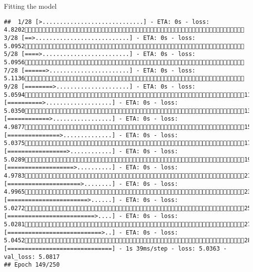 \documentclass[
  ignorenonframetext,
]{beamer}
\begin{document}
\begin{frame}[fragile]{Fitting the model}
\begin{verbatim}
##  1/28 [>.............................] - ETA: 0s - loss: 4.8202 3/28 [==>...........................] - ETA: 0s - loss: 5.0952 5/28 [====>.........................] - ETA: 0s - loss: 5.0956 7/28 [======>.......................] - ETA: 0s - loss: 5.1136 9/28 [========>.....................] - ETA: 0s - loss: 5.059411/28 [==========>...................] - ETA: 0s - loss: 5.035013/28 [============>.................] - ETA: 0s - loss: 4.987715/28 [===============>..............] - ETA: 0s - loss: 5.037517/28 [=================>............] - ETA: 0s - loss: 5.028919/28 [===================>..........] - ETA: 0s - loss: 4.978321/28 [=====================>........] - ETA: 0s - loss: 4.996523/28 [=======================>......] - ETA: 0s - loss: 5.027225/28 [=========================>....] - ETA: 0s - loss: 5.028127/28 [===========================>..] - ETA: 0s - loss: 5.045228/28 [==============================] - 1s 39ms/step - loss: 5.0363 - val_loss: 5.0817
## Epoch 149/250

\end{verbatim}
\end{frame}
\end{document}
